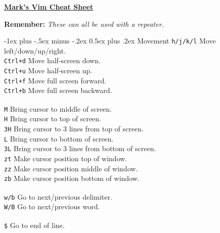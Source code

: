 \documentclass[10pt,landscape]{article}
\makeatletter
\renewcommand{\section}{\@startsection{section}{1}{0mm}%
                                {-1ex plus -.5ex minus -.2ex}%
                                {0.5ex plus .2ex}%
                                {\normalfont\large\bfseries}}
\makeatother
\begin{document}
\raggedright
\begin{multicols}{3}

\setlength{\columnseprule}{0.25pt}
\setlength{\premulticols}{1pt}
\setlength{\postmulticols}{1pt}
\setlength{\multicolsep}{1pt}
\setlength{\columnsep}{2pt}

\begin{center}
     \Large{\underline{\textbf{Mark's Vim Cheat Sheet}}} \\
\end{center}

\textbf{Remember: }\textit{These can all be used with a repeater.}

\section{Movement}
\verb!h/j/k/l! \hfill Move left/down/up/right.\\
\verb!Ctrl+d! \hfill Move half-screen down.\\
\verb!Ctrl+u! \hfill Move half-screen up.\\
\verb!Ctrl+f! \hfill Move full screen forward.\\
\verb!Ctrl+b! \hfill Move full screen backward.\\
\verb! !\\
\verb!M! \hfill Bring cursor to middle of screen.\\
\verb!H! \hfill Bring cursor to top of screen.\\
\verb!3H! \hfill Bring cursor to 3 lines from top of screen.\\
\verb!L! \hfill Bring cursor to bottom of screen.\\
\verb!3L! \hfill Bring cursor to 3 lines from bottom of screen.\\
\verb!zt! \hfill Make cursor position top of window.\\
\verb!zz! \hfill Make cursor position middle of window.\\
\verb!zb! \hfill Make cursor position bottom of window.\\
\verb! !\\
\verb!w/b! \hfill Go to next/previous delimiter.\\
\verb!W/B! \hfill Go to next/previous word.\\
\verb! !\\
\verb!$! \hfill Go to end of line.\\

\end{multicols}
\end{document}
